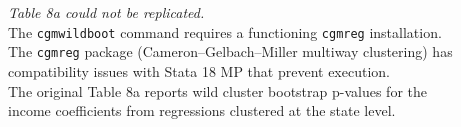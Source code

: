\begin{center}
\textit{Table 8a could not be replicated.}\\[0.5em]
The \texttt{cgmwildboot} command requires a functioning \texttt{cgmreg} installation.\\
The \texttt{cgmreg} package (Cameron--Gelbach--Miller multiway clustering) has\\
compatibility issues with Stata 18 MP that prevent execution.\\[0.5em]
The original Table 8a reports wild cluster bootstrap p-values for the\\
income coefficients from regressions clustered at the state level.
\end{center}
